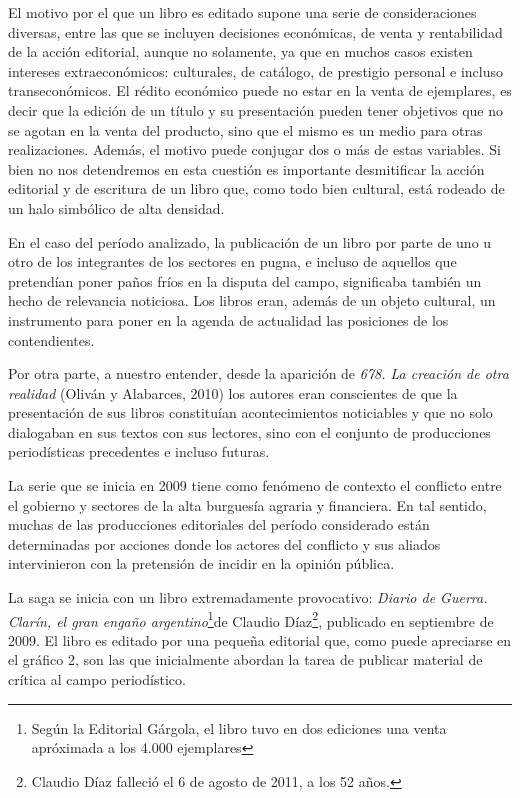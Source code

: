 El motivo por el que un libro es editado supone una serie de consideraciones diversas, entre las que se incluyen decisiones económicas, de venta y rentabilidad de la acción editorial, aunque no solamente, ya que en muchos casos existen intereses extraeconómicos: culturales, de catálogo, de prestigio personal e incluso transeconómicos. El rédito económico puede no estar en la venta de ejemplares, es decir que la edición de un título y su presentación pueden tener objetivos que no se agotan en la venta del producto, sino que el mismo es un medio para otras realizaciones. Además, el motivo puede conjugar dos o más de estas variables. Si bien no nos detendremos en esta cuestión es importante desmitificar la acción editorial y de escritura de un libro que, como todo bien cultural, está rodeado de un halo simbólico de alta densidad.

En el caso del período analizado, la publicación de un libro por parte de uno u otro de los integrantes de los sectores en pugna, e incluso de aquellos que pretendían poner paños fríos en la disputa del campo, significaba también un hecho de relevancia noticiosa. Los libros eran, además de un objeto cultural, un instrumento para poner en la agenda de actualidad las posiciones de los contendientes.

Por otra parte, a nuestro entender, desde la aparición de \emph{678. La creación de otra realidad} (Oliván y Alabarces, 2010) los autores eran conscientes de que la presentación de sus libros constituían acontecimientos noticiables y que no solo dialogaban en sus textos con sus lectores, sino con el conjunto de producciones periodísticas precedentes e incluso futuras.

La serie que se inicia en 2009 tiene como fenómeno de contexto el conflicto entre el gobierno y sectores de la alta burguesía agraria y financiera. En tal sentido, muchas de las producciones editoriales del período considerado están determinadas por acciones donde los actores del conflicto y sus aliados intervinieron con la pretensión de incidir en la opinión pública.

La saga se inicia con un libro extremadamente provocativo: \emph{Diario de Guerra. Clarín, el gran engaño argentino}\footnote{Según la Editorial Gárgola, el libro tuvo en dos ediciones una venta apróximada a los 4.000 ejemplares}de Claudio Díaz\footnote{Claudio Díaz falleció el 6 de agosto de 2011, a los 52 años.}, publicado en septiembre de 2009. El libro es editado por una pequeña editorial que, como puede apreciarse en el gráfico 2, son las que inicialmente abordan la tarea de publicar material de crítica al campo periodístico.

